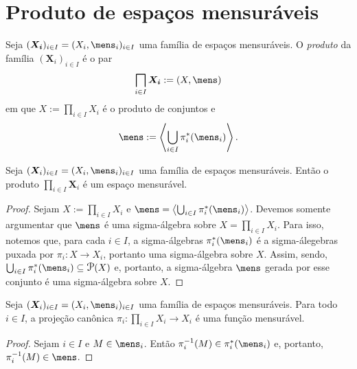 \section{Produto de espaços mensuráveis}

\begin{defi}
Seja $(\bm{X_i})_{i \in I} = (X_i,\mens_i)_{i \in I}$ uma família de espaços mensuráveis. O \emph{produto} da família $(\bm X_i)_{i \in I}$ é o par
	\begin{equation*}
	\prod_{i \in I} \bm{X_i} := (X,\mens)
	\end{equation*}
em que $X := \prod_{i \in I} X_i$ é o produto de conjuntos e
	\begin{equation*}
	\mens := \ger{\bigcup_{i \in I} \pi_i^*(\mens_i)}.
	\end{equation*}
\end{defi}

\begin{prop}
Seja $(\bm X_i)_{i \in I} = (X_i,\mens_i)_{i \in I}$ uma família de espaços mensuráveis. Então o produto $\prod_{i \in I} \bm X_i$ é um espaço mensurável.
\end{prop}
\begin{proof}
Sejam $X := \prod_{i \in I} X_i$ e $\mens=\ger{\bigcup_{i \in I} \pi_i^*(\mens_i)}$. Devemos somente argumentar que $\mens$ é uma sigma-álgebra sobre $X= \prod_{i \in I} X_i$. Para isso, notemos que, para cada $i \in I$, a sigma-álgebras $\pi_i^*(\mens_i)$ é a sigma-álegebras puxada por $\pi_i: X \to X_i$, portanto uma sigma-álgebra sobre $X$. Assim, sendo, $\bigcup_{i \in I} \pi_i^*(\mens_i) \subseteq \p(X)$ e, portanto, a sigma-álgebra $\mens$ gerada por esse conjunto é uma sigma-álgebra sobre $X$.
\end{proof}

\begin{prop}
Seja $(\bm X_i)_{i \in I} = (X_i,\mens_i)_{i \in I}$ uma família de espaços mensuráveis. Para todo $i \in I$, a projeção canônica $\pi_i: \prod_{i \in I} X_i \to X_i$ é uma função mensurável.
\end{prop}
\begin{proof}
Sejam $i \in I$ e $M \in \mens_i$. Então $\pi_i\inv(M) \in \pi_i^*(\mens_i)$ e, portanto, $\pi_i\inv(M) \in \mens$.
\end{proof}

